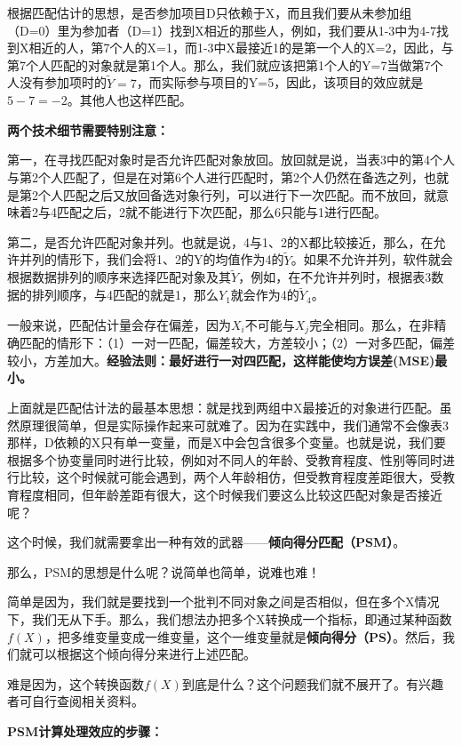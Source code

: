 \documentclass[cn,12pt,math=newtx,citestyle=gb7714-2015,bibstyle=gb7714-2015]{elegantbook}
\begin{document}
	根据匹配估计的思想，是否参加项目D只依赖于X，而且我们要从未参加组（D=0）里为参加者（D=1）找到X相近的那些人，例如，我们要从1-3中为4-7找到X相近的人，第7个人的X=1，而1-3中X最接近1的是第一个人的X=2，因此，与第7个人匹配的对象就是第1个人。那么，我们就应该把第1个人的Y=7当做第7个人没有参加项时的$\tilde{Y}=7$，而实际参与项目的Y=5，因此，该项目的效应就是$5-7=-2$。其他人也这样匹配。
	
	\textbf{两个技术细节需要特别注意：}
	
	第一，在寻找匹配对象时是否允许匹配对象放回。放回就是说，当表3中的第4个人与第2个人匹配了，但是在对第6个人进行匹配时，第2个人仍然在备选之列，也就是第2个人匹配之后又放回备选对象行列，可以进行下一次匹配。而不放回，就意味着2与4匹配之后，2就不能进行下次匹配，那么6只能与1进行匹配。
	
	第二，是否允许匹配对象并列。也就是说，4与1、2的X都比较接近，那么，在允许并列的情形下，我们会将1、2的Y的均值作为4的$\tilde{Y}$。如果不允许并列，软件就会根据数据排列的顺序来选择匹配对象及其$\tilde{Y}$，例如，在不允许并列时，根据表3数据的排列顺序，与4匹配的就是1，那么$Y_1$就会作为4的$\tilde{Y}_4$。
	
	一般来说，匹配估计量会存在偏差，因为$X_i$不可能与$X_j$完全相同。那么，在非精确匹配的情形下：（1）一对一匹配，偏差较大，方差较小；（2）一对多匹配，偏差较小，方差加大。\textbf{经验法则：最好进行一对四匹配，这样能使均方误差(MSE)最小。}
	
	上面就是匹配估计法的最基本思想：就是找到两组中X最接近的对象进行匹配。虽然原理很简单，但是实际操作起来可就难了。因为在实践中，我们通常不会像表3那样，D依赖的X只有单一变量，而是X中会包含很多个变量。也就是说，我们要根据多个协变量同时进行比较，例如对不同人的年龄、受教育程度、性别等同时进行比较，这个时候就可能会遇到，两个人年龄相仿，但受教育程度差距很大，受教育程度相同，但年龄差距有很大，这个时候我们要这么比较这匹配对象是否接近呢？
	
	这个时候，我们就需要拿出一种有效的武器——\textbf{倾向得分匹配（PSM）}。
	
	那么，PSM的思想是什么呢？说简单也简单，说难也难！
	
	简单是因为，我们就是要找到一个批判不同对象之间是否相似，但在多个X情况下，我们无从下手。那么，我们想法办把多个X转换成一个指标，即通过某种函数$f(X)$，把多维变量变成一维变量，这个一维变量就是\textbf{倾向得分（PS）}。然后，我们就可以根据这个倾向得分来进行上述匹配。
	
	难是因为，这个转换函数$f(X)$到底是什么？这个问题我们就不展开了。有兴趣者可自行查阅相关资料。
	
	\textbf{PSM计算处理效应的步骤：}
	
\end{document}
